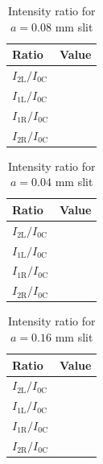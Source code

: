 \begin{table}[ht!]
    \centering
    \begin{tabular}{|l|r|}
        \hline
        Ratio & Value \\
        \hline
        $I_{\text{2L}} / I_{\text{0C}}$ & \\
        $I_{\text{1L}} / I_{\text{0C}}$ & \\
        \hline
        $I_{\text{1R}} / I_{\text{0C}}$ & \\
        $I_{\text{2R}} / I_{\text{0C}}$ & \\
        \hline
    \end{tabular}
    \caption{Intensity ratio for $a = 0.08$ mm slit}
    \label{table.11.intensity.8}
\end{table}
\begin{table}[ht!]
    \centering
    \begin{tabular}{|l|r|}
        \hline
        Ratio & Value \\
        \hline
        $I_{\text{2L}} / I_{\text{0C}}$ & \\
        $I_{\text{1L}} / I_{\text{0C}}$ & \\
        \hline
        $I_{\text{1R}} / I_{\text{0C}}$ & \\
        $I_{\text{2R}} / I_{\text{0C}}$ & \\
        \hline
    \end{tabular}
    \caption{Intensity ratio for $a = 0.04$ mm slit}
    \label{table.11.intensity.4}
\end{table}
\begin{table}[ht!]
    \centering
    \begin{tabular}{|l|r|}
        \hline
        Ratio & Value \\
        \hline
        $I_{\text{2L}} / I_{\text{0C}}$ & \\
        $I_{\text{1L}} / I_{\text{0C}}$ & \\
        \hline
        $I_{\text{1R}} / I_{\text{0C}}$ & \\
        $I_{\text{2R}} / I_{\text{0C}}$ & \\
        \hline
    \end{tabular}
    \caption{Intensity ratio for $a = 0.16$ mm slit}
    \label{table.11.intensity.16}
\end{table}
\FloatBarrier
\newpage
